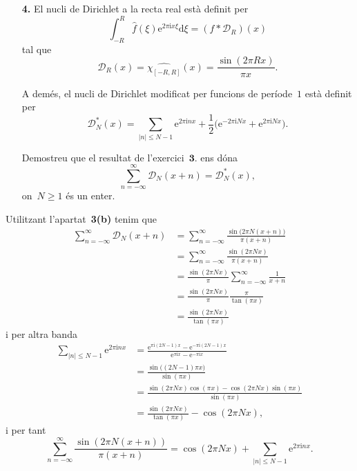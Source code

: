 \documentclass[a4paper]{article}
\theoremstyle{plain}
\newcommand{\iu}{\mathrm{i}}
\newcommand{\e}{\mathrm{e}}
\providecommand{\uppi}{\pi}
\newcommand{\diff}{\mathrm{d}}
\newcommand{\abs}[1]{\lvert{#1}\rvert}
\newcommand{\D}{\mathcal{D}}
\begin{document}
\begin{enumerate}
    \item[\textbf{4.}] El nucli de Dirichlet a la recta real està definit per
        \[
            \int_{-R}^{R}\widehat{f}(\xi)\e^{2\uppi\iu x\xi}\diff\xi
            = (f\ast \D_{R})(x)
        \]
        tal que
        \[
            \D_{R}(x) = \widehat{\chi_{[-R,R]}}(x)
            = \frac{\sin(2\uppi Rx)}{\uppi x}.
        \]

        A demés, el nucli de Dirichlet modificat per funcions de període~\(1\)
        està definit per
        \[
            \D^{\ast}_{N}(x)
            = \sum_{\abs{n} \leq N-1} \e^{2\uppi\iu nx}
            + \frac{1}{2}\bigl(\e^{-2\uppi\iu Nx} + \e^{2\uppi\iu Nx}\bigr).
        \]

        Demostreu que el resultat de l'exercici~\(\textbf{3.}\) ens dóna
        \[
            \sum_{n=-\infty}^{\infty} \D_{N}(x+n) = \D^{\ast}_{N}(x),
        \]
        on~\(N\geq1\) és un enter.
\end{enumerate}

Utilitzant l'apartat~\textbf{3(b)} tenim que
\begin{align*}
    \sum_{n=-\infty}^{\infty} \D_{N}(x+n)
        &= \sum_{n=-\infty}^{\infty}
           \frac{\sin\bigl(2\uppi N(x+n)\bigr)}{\uppi(x+n)} \\
        &= \sum_{n=-\infty}^{\infty}
           \frac{\sin(2\uppi Nx)}{\uppi(x+n)} \\
        &= \frac{\sin(2\uppi Nx)}{\uppi}
           \sum_{n=-\infty}^{\infty}
           \frac{1}{x+n} \\
        &= \frac{\sin(2\uppi Nx)}{\uppi}
           \frac{\uppi}{\tan(\uppi x)} \\
        &= \frac{\sin(2\uppi Nx)}{\tan(\uppi x)}
\end{align*}
i per altra banda
\begin{align*}
    \sum_{\abs{n} \leq N-1} \e^{2\uppi\iu nx}
        &= \frac{\e^{\uppi\iu(2N-1)x}-\e^{-\uppi\iu(2N-1)x}}
           {\e^{\uppi\iu x}-\e^{-\uppi\iu x}} \\
        &= \frac{\sin\bigl((2N-1)\uppi x\bigr)}{\sin(\uppi x)} \\
        &= \frac{\sin(2\uppi Nx)\cos(\uppi x) - \cos(2\uppi Nx)\sin(\uppi x)}
           {\sin(\uppi x)} \\
        &= \frac{\sin(2\uppi Nx)}{\tan(\uppi x)} - \cos(2\uppi Nx),
\end{align*}
i per tant
\[
    \sum_{n=-\infty}^{\infty}
    \frac{\sin(2\uppi N(x+n))}{\uppi(x+n)}
    =
    \cos(2\uppi Nx) +
    \sum_{\abs{n} \leq N-1} \e^{2\uppi\iu nx}.
\]
\end{document}
